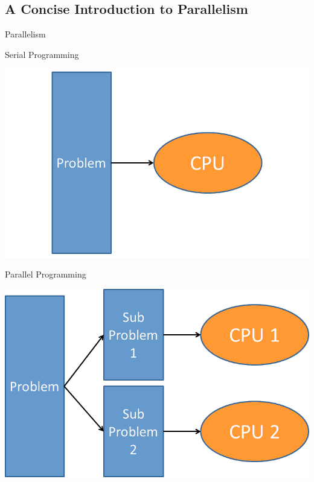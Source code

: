 \subsection{A Concise Introduction to Parallelism}
\makesubcontentsslidessec


\begin{frame}
  \begin{block}{Parallelism}\pause
    \begin{center}
    \begin{minipage}{.46\textwidth}
    \begin{block}{\centering Serial Programming}
      \begin{center}
      \includegraphics[width=.975\textwidth]{../common/pics/parallelism1}
      \end{center}
      \end{block}
    \end{minipage}
    \hspace{.15cm}
    \begin{minipage}{.46\textwidth}
    \begin{block}{\centering Parallel Programming}
      \begin{center}
      \includegraphics[width=.975\textwidth]{../common/pics/parallelism2}
      \end{center}
      \end{block}
    \end{minipage}
    \end{center}
  \end{block}
\end{frame}

